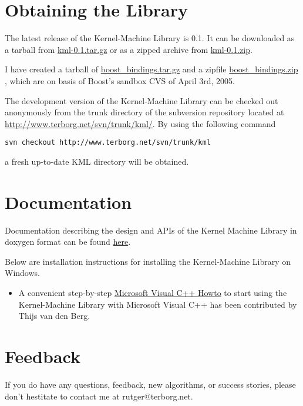 \documentclass{article}
\begin{document}
\section*{Obtaining the Library}
\label{section:downloads}

The latest release of the Kernel-Machine Library is 0.1. It can be downloaded as a tarball 
from \href{research/kml/kml-0.1.tar.gz}{kml-0.1.tar.gz} or as a zipped archive
from \href{research/kml/kml-0.1.zip}{kml-0.1.zip}.

I have created a tarball of 
\href{research/kml/boost\_bindings.tar.gz}{boost\_bindings.tar.gz}
 and a zipfile 
\href{research/kml/boost\_bindings.zip}{boost\_bindings.zip}%
, which are on basis of Boost's sandbox CVS of April 3rd, 2005.


The development version of the Kernel-Machine Library can be checked out anonymously from 
the trunk directory of the subversion repository located at 
\href{http://www.terborg.net/svn/trunk/kml/}{http://www.terborg.net/svn/trunk/kml/}. By using the following command
\begin{verbatim}
svn checkout http://www.terborg.net/svn/trunk/kml
\end{verbatim}
a fresh up-to-date KML directory will be obtained. 

\section*{Documentation}

Documentation describing the design and APIs of the Kernel Machine Library 
in doxygen format can be found \href{research/kml/doxygen/}{here}.

Below are installation instructions for installing the Kernel-Machine Library on 
Windows.

\begin{itemize}

\item A convenient step-by-step 
\href{research/kml/installation.html}{Microsoft Visual C++ Howto} 
to start using the Kernel-Machine Library with Microsoft Visual C++ has been 
contributed by Thijs van den Berg.

\end{itemize}


\section*{Feedback}

If you do have any questions, feedback, new algorithms, or success stories, 
please don't hestitate to contact me at rutger@terborg.net.




\end{document}
